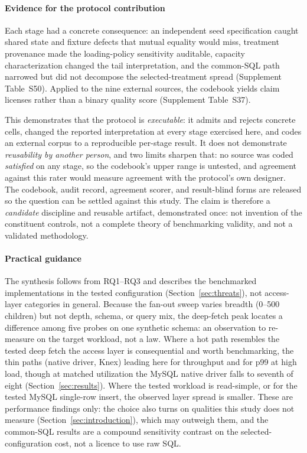 \paragraph{Evidence for the protocol contribution}
Each stage had a concrete consequence: an independent seed specification caught shared state and
fixture defects that mutual equality would miss, treatment provenance made the loading-policy
sensitivity auditable, capacity characterization changed the tail interpretation, and the common-SQL
path narrowed but did not decompose the selected-treatment spread (Supplement Table~S50). Applied to
the nine external sources, the codebook yields claim licenses rather than a binary quality score
(Supplement Table~S37).

This demonstrates that the protocol is \emph{executable}: it admits and rejects concrete cells,
changed the reported interpretation at every stage exercised here, and codes an external corpus to a
reproducible per-stage result.
It does not demonstrate \emph{reusability by another person}, and two limits sharpen that: no source
was coded \emph{satisfied} on any stage, so the codebook's upper range is untested, and agreement
against this rater would measure agreement with the protocol's own designer.
The codebook, audit record, agreement scorer, and result-blind forms are released so the question can
be settled against this study.
The claim is therefore a \emph{candidate} discipline and reusable artifact, demonstrated once: not
invention of the constituent controls, not a complete theory of benchmarking validity, and not a
validated methodology.

\paragraph{Practical guidance}
The synthesis follows from RQ1--RQ3 and describes the benchmarked implementations in the tested
configuration (Section~\ref{sec:threats}), not access-layer categories in general.
Because the fan-out sweep varies breadth (0--500 children) but not depth, schema, or query mix, the
deep-fetch peak locates a difference among five probes on one synthetic schema: an observation to
re-measure on the target workload, not a law.
Where a hot path resembles the tested deep fetch the access layer is consequential and worth
benchmarking, the thin paths (native driver, Knex) leading here for throughput and for p99 at high
load, though at matched utilization the MySQL native driver falls to seventh of eight
(Section~\ref{sec:results}).
Where the tested workload is read-simple, or for the tested MySQL single-row insert, the observed
layer spread is smaller.
These are performance findings only: the choice also turns on qualities this study does not measure
(Section~\ref{sec:introduction}), which may outweigh them, and the common-SQL results are a compound
sensitivity contrast on the selected-configuration cost, not a licence to use raw SQL.
